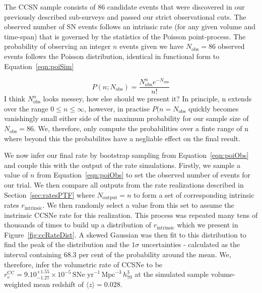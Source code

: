 \documentclass[a4paper,fleqn,usenatbib]{mnras}
\newcommand{\chris}[1]{\color{orange}#1\color{black}}
\begin{document}
The CCSN sample consists of 86 candidate events that were discovered in our previously described sub-surveys and passed our strict observational cuts. The observed number of SN events follows an intrinsic rate (for any given volume and time-span) that is governed by the statistics of the Poisson point-process. The probability of observing an integer $n$ events given we have $N_\mathrm{obs}=86$ observed events follows the Poisson distribution, identical in functional form to Equation~\ref{eqn:poiSim} 

\begin{equation}
    P(n; N_\mathrm{obs})=\frac{N_\mathrm{obs}^{n} e^{-N_\mathrm{obs}}}{n!}
    \label{eqn:poiObs}
\end{equation}
\chris{I think $N_\mathrm{obs}^{n}$ looks messey, how else should we present it?}
In principle, n extends over the range $0 \le n \le \infty$, however, in practise $P(n=N_\mathrm{obs}$ quickly becomes vanishingly small either side of the maximum probability for our sample size of $N_\mathrm{obs}=86$. We, therefore, only compute the probabilities over a finte range of n where beyond this the probabilites have a negliable effect on the final result.

We now infer our final rate by bootstrap sampling from Equation~\ref{eqn:poiObs} and couple this with the output of the rate simulations. Firstly, we sample a value of $n$ from Equation~\ref{eqn:poiObs} to set the observed number of events for our trial. We then compare all outputs from the rate realizations described in Section~\ref{sec:ratesPTF} where $N_\mathrm{output} =  n$ to form a set of corresponding intrinsic rates $r_\mathrm{intrinsic}$. We then randomly select a value from this set to assume the instrinsic CCSNe rate for this realization. This process was repeated many tens of thousands of times to build up a distribution of $r_\mathrm{intrinsic}$ which we present in Figure~\ref{fig:ccRateDist}. A skewed Gaussian was then fit to this distribution to find the peak of the distribution and the $1\sigma$ uncertainties - calculated as the interval containing 68.3 per cent of the probability around the mean. We, therefore, infer the volumetric rate of CCSNe to be $r^\mathrm{CC}_v=9.10_{-1.27}^{+1.55}\times10^{-5}\,\text{SNe yr}^{-1}\,\text{Mpc}^{-3}\, h_{70}^{3}$ at the simulated sample volume-weighted mean redshift of $ \langle z \rangle = 0.028$.
\end{document}
